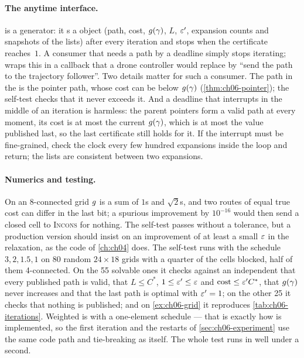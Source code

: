 \paragraph{The anytime interface.}
 is a \python generator: it s a
 object (path, cost, $g(\gamma)$, $L$, $\varepsilon'$, expansion
counts and snapshots of the lists) after every iteration and stops when the
certificate reaches~$1$. A consumer that needs a path by a deadline simply
stops iterating;  wraps this in a callback that a drone
controller would replace by ``send the path to the trajectory follower''.
Two details matter for such a consumer. The path in the  is
the pointer path, whose cost can be below $g(\gamma)$
(\cref{thm:ch06-pointer}); the self-test checks that it never exceeds it.
And a deadline that interrupts \AraImprovePath in the middle of an iteration
is harmless: the parent pointers form a valid path at every moment, its cost
is at most the current $g(\gamma)$, which is at most the value published
last, so the last certificate still holds for it. If the interrupt must be
fine-grained, check the clock every few hundred expansions inside the loop
and return; the lists are consistent between two expansions.

\paragraph{Numerics and testing.}
On an 8-connected grid $g$ is a sum of $1$s and $\sqrt{2}$s, and two
routes of equal true cost can differ in the last bit; a spurious improvement
by $10^{-16}$ would then send a closed cell to \textsc{Incons} for nothing.
The self-test passes without a tolerance, but a production version should
insist on an improvement of at least a small $\varepsilon$ in the relaxation, as
the \astar code of \cref{ch:ch04} does. The self-test runs \arastar with the
schedule $3, 2, 1.5, 1$ on 80 random $24 \times 18$ grids with a quarter of
the cells blocked, half of them 4-connected. On the 55 solvable ones it checks
against an independent \astar that every published path is valid, that $L \le
C^*$, $1 \le \varepsilon' \le \varepsilon$ and $\operatorname{cost} \le \varepsilon' C^*$, that $g(\gamma)$
never increases and that the last path is optimal with $\varepsilon' = 1$; on the
other 25 it checks that nothing is published; and on \cref{ex:ch06-grid} it
reproduces \cref{tab:ch06-iterations}. Weighted \astar is \arastar with a
one-element schedule --- that is exactly how  is
implemented, so the first iteration and the restarts of
\cref{sec:ch06-experiment} use the same code path and tie-breaking as \arastar
itself. The whole test runs in well under a second.

